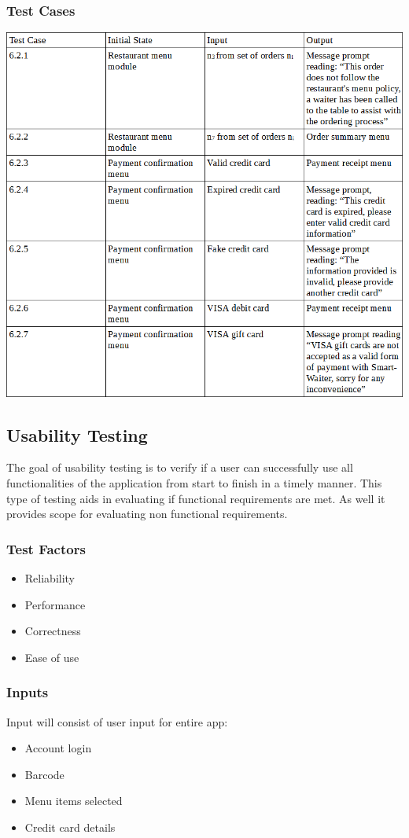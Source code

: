 \documentclass[12pt]{article}
\begin{document}
\subsubsection{Test Cases}
\includegraphics[width=\textwidth,height=\textheight,keepaspectratio]{orderTransactionTC.png}

\subsection{Usability Testing}
The goal of usability testing is to verify if a user can successfully use all functionalities of the application from start to finish in a timely manner. This type of testing aids in evaluating if functional requirements are met. As well it provides scope for evaluating non functional requirements.
\subsubsection{Test Factors}
\begin{itemize}
  \item Reliability 
  \item Performance
  \item 	Correctness
  \item 	Ease of use
\end{itemize}
\subsubsection{Inputs}
Input will consist of user input for entire app:
\begin{itemize}
  \item Account login
  \item Barcode
  \item Menu items selected
  \item Credit card details
\end{itemize}
\end{document}
